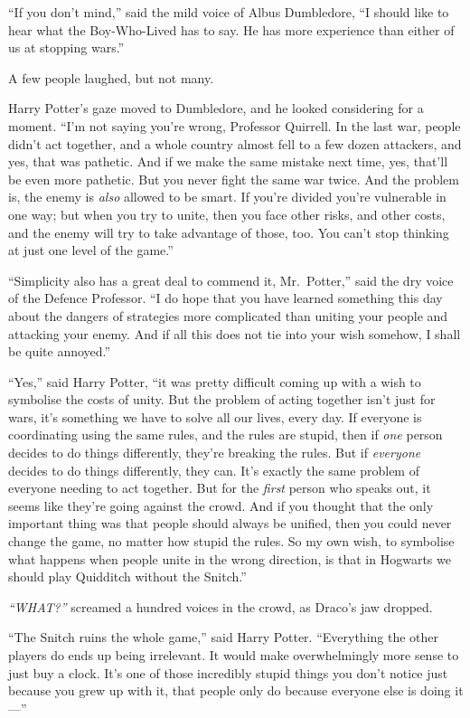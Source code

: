 ``If you don't mind,'' said the mild voice of Albus Dumbledore, ``I
should like to hear what the Boy-Who-Lived has to say. He has more
experience than either of us at stopping wars.''

A few people laughed, but not many.

Harry Potter's gaze moved to Dumbledore, and he looked considering for a
moment. ``I'm not saying you're wrong, Professor Quirrell. In the last
war, people didn't act together, and a whole country almost fell to a
few dozen attackers, and yes, that was pathetic. And if we make the same
mistake next time, yes, that'll be even more pathetic. But you never
fight the same war twice. And the problem is, the enemy is \emph{also}
allowed to be smart. If you're divided you're vulnerable in one way; but
when you try to unite, then you face other risks, and other costs, and
the enemy will try to take advantage of those, too. You can't stop
thinking at just one level of the game.''

``Simplicity also has a great deal to commend it, Mr.~Potter,'' said the
dry voice of the Defence Professor. ``I do hope that you have learned
something this day about the dangers of strategies more complicated than
uniting your people and attacking your enemy. And if all this does not
tie into your wish somehow, I shall be quite annoyed.''

``Yes,'' said Harry Potter, ``it was pretty difficult coming up with a
wish to symbolise the costs of unity. But the problem of acting together
isn't just for wars, it's something we have to solve all our lives,
every day. If everyone is coordinating using the same rules, and the
rules are stupid, then if \emph{one} person decides to do things
differently, they're breaking the rules. But if \emph{everyone} decides
to do things differently, they can. It's exactly the same problem of
everyone needing to act together. But for the \emph{first} person who
speaks out, it seems like they're going against the crowd. And if you
thought that the only important thing was that people should always be
unified, then you could never change the game, no matter how stupid the
rules. So my own wish, to symbolise what happens when people unite in
the wrong direction, is that in Hogwarts we should play Quidditch
without the Snitch.''

\emph{``WHAT?''} screamed a hundred voices in the crowd, as Draco's jaw
dropped.

``The Snitch ruins the whole game,'' said Harry Potter. ``Everything the
other players do ends up being irrelevant. It would make overwhelmingly
more sense to just buy a clock. It's one of those incredibly stupid
things you don't notice just because you grew up with it, that people
only do because everyone else is doing it---''

